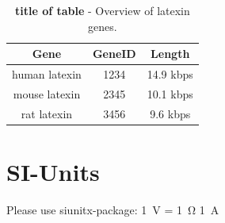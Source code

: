 





\begin{table}[htp]
\centering
\begin{tabular}{ccc} %

{\bf Gene} & {\bf GeneID} & {\bf Length} \\
\hline %

human latexin & 1234 & 14.9 kbps \\
mouse latexin & 2345 & 10.1 kbps \\
rat latexin   & 3456 & 9.6 kbps \\

\end{tabular}
\caption[title of table]{\textbf{title of table} - Overview of latexin genes.}
\label{latexin_genes} %
\end{table}






\section{SI-Units}

Please use siunitx-package:
\SI{1}{\volt} = \SI{1}{\ohm} \SI{1}{\ampere}


